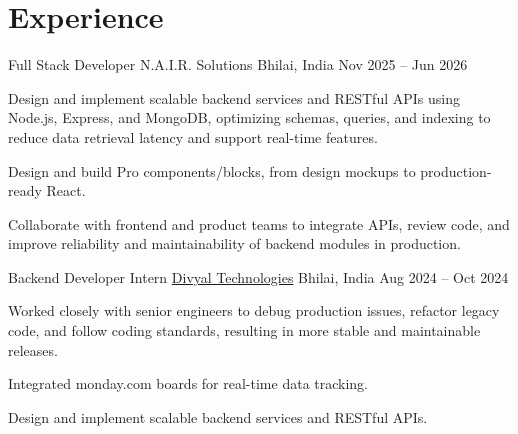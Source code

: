\section*{Experience}

\experience
  {Full Stack Developer}
  {N.A.I.R. Solutions}
  {Bhilai, India}
  {Nov 2025 -- Jun 2026}
  {
    \item Design and implement scalable backend services and RESTful APIs using Node.js, Express, and MongoDB, optimizing schemas, queries, and indexing to reduce data retrieval latency and support real-time features.
    \item Design and build Pro components/blocks, from design mockups to production-ready React.
    \item Collaborate with frontend and product teams to integrate APIs, review code, and improve reliability and maintainability of backend modules in production.
  }

\experience
  {Backend Developer Intern}
  {\href{https://www.divyaltech.com/}{Divyal Technologies}}
  {Bhilai, India}
  {Aug 2024 -- Oct 2024}
  {
    \item Worked closely with senior engineers to debug production issues, refactor legacy code, and follow coding standards, resulting in more stable and maintainable releases.
    \item Integrated monday.com boards for real-time data tracking.
    \item Design and implement scalable backend services and RESTful APIs. 
  }
